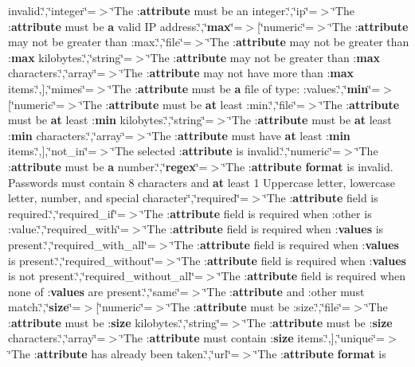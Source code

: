 \begin{DoxyCompactItemize}
invalid.\char`\"{},\char`\"{}integer\char`\"{}=$>$\char`\"{}The \+:{\bf attribute} must be an integer.\char`\"{},\char`\"{}ip\char`\"{}=$>$\char`\"{}The \+:{\bf attribute} must be {\bf a} valid I\+P address.\char`\"{},\char`\"{}{\bf max}\char`\"{}=$>$[\char`\"{}numeric\char`\"{}=$>$\char`\"{}The \+:{\bf attribute} may not be greater than \+:max.\char`\"{},\char`\"{}file\char`\"{}=$>$\char`\"{}The \+:{\bf attribute} may not be greater than \+:{\bf max} kilobytes.\char`\"{},\char`\"{}string\char`\"{}=$>$\char`\"{}The \+:{\bf attribute} may not be greater than \+:{\bf max} characters.\char`\"{},\char`\"{}array\char`\"{}=$>$\char`\"{}The \+:{\bf attribute} may not have more than \+:{\bf max} items.\char`\"{},],\char`\"{}mimes\char`\"{}=$>$\char`\"{}The \+:{\bf attribute} must be {\bf a} file of type\+: \+:values.\char`\"{},\char`\"{}{\bf min}\char`\"{}=$>$[\char`\"{}numeric\char`\"{}=$>$\char`\"{}The \+:{\bf attribute} must be {\bf at} least \+:min.\char`\"{},\char`\"{}file\char`\"{}=$>$\char`\"{}The \+:{\bf attribute} must be {\bf at} least \+:{\bf min} kilobytes.\char`\"{},\char`\"{}string\char`\"{}=$>$\char`\"{}The \+:{\bf attribute} must be {\bf at} least \+:{\bf min} characters.\char`\"{},\char`\"{}array\char`\"{}=$>$\char`\"{}The \+:{\bf attribute} must have {\bf at} least \+:{\bf min} items.\char`\"{},],\char`\"{}not\+\_\+in\char`\"{}=$>$\char`\"{}The selected \+:{\bf attribute} is invalid.\char`\"{},\char`\"{}numeric\char`\"{}=$>$\char`\"{}The \+:{\bf attribute} must be {\bf a} number.\char`\"{},\char`\"{}{\bf regex}\char`\"{}=$>$\char`\"{}The \+:{\bf attribute} {\bf format} is invalid. Passwords must contain 8 characters and {\bf at} least 1 Uppercase letter, lowercase letter, number, and special character\char`\"{},\char`\"{}required\char`\"{}=$>$\char`\"{}The \+:{\bf attribute} field is required.\char`\"{},\char`\"{}required\+\_\+if\char`\"{}=$>$\char`\"{}The \+:{\bf attribute} field is required when \+:other is \+:value.\char`\"{},\char`\"{}required\+\_\+with\char`\"{}=$>$\char`\"{}The \+:{\bf attribute} field is required when \+:{\bf values} is present.\char`\"{},\char`\"{}required\+\_\+with\+\_\+all\char`\"{}=$>$\char`\"{}The \+:{\bf attribute} field is required when \+:{\bf values} is present.\char`\"{},\char`\"{}required\+\_\+without\char`\"{}=$>$\char`\"{}The \+:{\bf attribute} field is required when \+:{\bf values} is not present.\char`\"{},\char`\"{}required\+\_\+without\+\_\+all\char`\"{}=$>$\char`\"{}The \+:{\bf attribute} field is required when none of \+:{\bf values} are present.\char`\"{},\char`\"{}same\char`\"{}=$>$\char`\"{}The \+:{\bf attribute} and \+:other must match.\char`\"{},\char`\"{}{\bf size}\char`\"{}=$>$[\char`\"{}numeric\char`\"{}=$>$\char`\"{}The \+:{\bf attribute} must be \+:size.\char`\"{},\char`\"{}file\char`\"{}=$>$\char`\"{}The \+:{\bf attribute} must be \+:{\bf size} kilobytes.\char`\"{},\char`\"{}string\char`\"{}=$>$\char`\"{}The \+:{\bf attribute} must be \+:{\bf size} characters.\char`\"{},\char`\"{}array\char`\"{}=$>$\char`\"{}The \+:{\bf attribute} must contain \+:{\bf size} items.\char`\"{},],\char`\"{}unique\char`\"{}=$>$\char`\"{}The \+:{\bf attribute} has already been taken.\char`\"{},\char`\"{}url\char`\"{}=$>$\char`\"{}The \+:{\bf attribute} {\bf format} is 
\end{DoxyCompactItemize}
